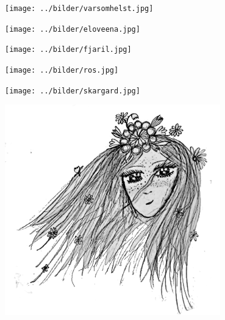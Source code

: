 
\sclearpage

\begin{intersong}
\begin{center}
\texttt{[image: ../bilder/varsomhelst.jpg]} 
\end{center}
\end{intersong}
\sclearpage

\sclearpage

\begin{intersong}
\begin{center}
\texttt{[image: ../bilder/eloveena.jpg]} 
\end{center}
\end{intersong}
\sclearpage

\begin{intersong}
\begin{center}
\texttt{[image: ../bilder/fjaril.jpg]} 
\end{center}
\end{intersong}
\sclearpage

\sclearpage

\sclearpage

\sclearpage

\sclearpage

\begin{intersong}
\begin{center}
	\vspace{20mm}
\texttt{[image: ../bilder/ros.jpg]} 
\end{center}
\end{intersong}
\sclearpage

\begin{intersong}
\begin{center}
	\vspace{20mm}
\texttt{[image: ../bilder/skargard.jpg]} 
\end{center}
\end{intersong}
\sclearpage

\sclearpage

\begin{intersong}
	\begin{center}
		\includegraphics[width=0.7\textwidth]{../bilder/fardigabilder/CamillasFardigaBilder/Svinstaskar2.png} 
	\end{center}
\end{intersong}
